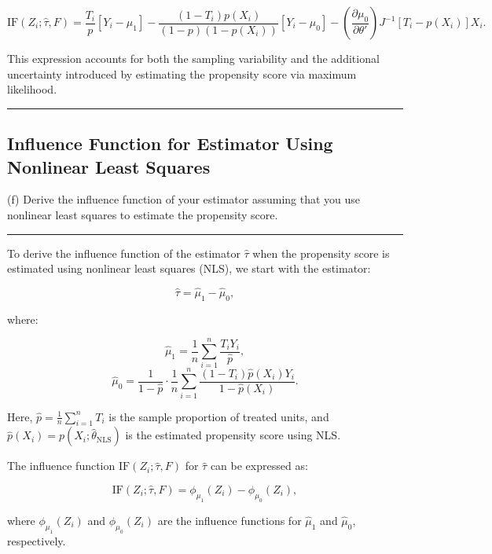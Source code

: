 \documentclass{article}
\newenvironment{colorparagraph}[1]{\par\color{#1}}{\par}
\begin{document}
\[
\text{IF}(Z_i; \hat{\tau}, F) = \frac{T_i}{p} [Y_i - \mu_1] - \frac{(1 - T_i) p(X_i)}{(1 - p)(1 - p(X_i))} [Y_i - \mu_0] - \left( \frac{\partial \mu_0}{\partial \theta'} \right) J^{-1} [T_i - p(X_i)] X_i.
\]

This expression accounts for both the sampling variability and the additional uncertainty introduced by estimating the propensity score via maximum likelihood.

\begin{colorparagraph}{questioncolor}
\label{q1f}
\rule{\textwidth}{0.5pt}
\subsection{Influence Function for Estimator Using Nonlinear Least Squares}
(f) Derive the influence function of your estimator assuming that you use nonlinear least squares to estimate the propensity score.

\rule{\textwidth}{0.5pt}
\end{colorparagraph}

To derive the influence function of the estimator \( \hat{\tau} \) when the propensity score is estimated using nonlinear least squares (NLS), we start with the estimator:

\[
\hat{\tau} = \hat{\mu}_1 - \hat{\mu}_0,
\]

where:

\[
\hat{\mu}_1 = \frac{1}{n} \sum_{i=1}^n \frac{T_i Y_i}{\hat{p}},
\]
\[
\hat{\mu}_0 = \frac{1}{1 - \hat{p}} \cdot \frac{1}{n} \sum_{i=1}^n \frac{(1 - T_i) \hat{p}(X_i) Y_i}{1 - \hat{p}(X_i)}.
\]

Here, \( \hat{p} = \frac{1}{n} \sum_{i=1}^n T_i \) is the sample proportion of treated units, and \( \hat{p}(X_i) = p(X_i; \hat{\theta}_{\text{NLS}}) \) is the estimated propensity score using NLS.

The influence function \( \text{IF}(Z_i; \hat{\tau}, F) \) for \( \hat{\tau} \) can be expressed as:

\[
\text{IF}(Z_i; \hat{\tau}, F) = \phi_{\mu_1}(Z_i) - \phi_{\mu_0}(Z_i),
\]

where \( \phi_{\mu_1}(Z_i) \) and \( \phi_{\mu_0}(Z_i) \) are the influence functions for \( \hat{\mu}_1 \) and \( \hat{\mu}_0 \), respectively.
\end{document}
